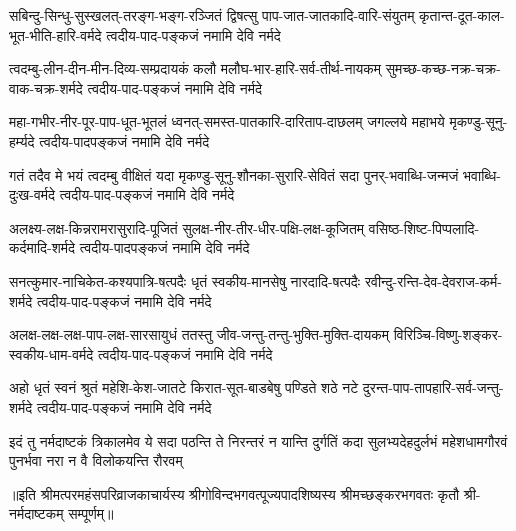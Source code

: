 
\fourlineindentedshloka
{सबिन्दु-सिन्धु-सुस्खलत्-तरङ्ग-भङ्ग-रञ्जितं}
{द्विषत्सु पाप-जात-जातकादि-वारि-संयुतम्}
{कृतान्त-दूत-काल-भूत-भीति-हारि-वर्मदे}
{त्वदीय-पाद-पङ्कजं नमामि देवि नर्मदे} %

\fourlineindentedshloka
{त्वदम्बु-लीन-दीन-मीन-दिव्य-सम्प्रदायकं}
{कलौ मलौघ-भार-हारि-सर्व-तीर्थ-नायकम्}
{सुमच्छ-कच्छ-नक्र-चक्र-वाक-चक्र-शर्मदे}
{त्वदीय-पाद-पङ्कजं नमामि देवि नर्मदे} %

\fourlineindentedshloka
{महा-गभीर-नीर-पूर-पाप-धूत-भूतलं}
{ध्वनत्-समस्त-पातकारि-दारिताप-दाछलम्}
{जगल्लये महाभये मृकण्डु-सूनु-हर्म्यदे}
{त्वदीय-पादपङ्कजं नमामि देवि नर्मदे} %

\fourlineindentedshloka
{गतं तदैव मे भयं त्वदम्बु वीक्षितं यदा}
{मृकण्डु-सूनु-शौनका-सुरारि-सेवितं सदा}
{पुनर्-भवाब्धि-जन्मजं भवाब्धि-दुःख-वर्मदे}
{त्वदीय-पाद-पङ्कजं नमामि देवि नर्मदे} %

\fourlineindentedshloka
{अलक्ष्य-लक्ष-किन्नरामरासुरादि-पूजितं}
{सुलक्ष-नीर-तीर-धीर-पक्षि-लक्ष-कूजितम्}
{वसिष्ठ-शिष्ट-पिप्पलादि-कर्दमादि-शर्मदे}
{त्वदीय-पादपङ्कजं नमामि देवि नर्मदे} %

\fourlineindentedshloka
{सनत्कुमार-नाचिकेत-कश्यपात्रि-षत्पदैः}
{धृतं स्वकीय-मानसेषु नारदादि-षत्पदैः}
{रवीन्दु-रन्ति-देव-देवराज-कर्म-शर्मदे}
{त्वदीय-पाद-पङ्कजं नमामि देवि नर्मदे} %

\fourlineindentedshloka
{अलक्ष-लक्ष-लक्ष-पाप-लक्ष-सारसायुधं}
{ततस्तु जीव-जन्तु-तन्तु-भुक्ति-मुक्ति-दायकम्}
{विरिञ्चि-विष्णु-शङ्कर-स्वकीय-धाम-वर्मदे}
{त्वदीय-पाद-पङ्कजं नमामि देवि नर्मदे} %

\fourlineindentedshloka
{अहो धृतं स्वनं श्रुतं महेशि-केश-जातटे}
{किरात-सूत-बाडबेषु पण्डिते शठे नटे}
{दुरन्त-पाप-तापहारि-सर्व-जन्तु-शर्मदे}
{त्वदीय-पाद-पङ्कजं नमामि देवि नर्मदे} %

\fourlineindentedshloka
{इदं तु नर्मदाष्टकं त्रिकालमेव ये सदा}
{पठन्ति ते निरन्तरं न यान्ति दुर्गतिं कदा}
{सुलभ्यदेहदुर्लभं महेशधामगौरवं}
{पुनर्भवा नरा न वै विलोकयन्ति रौरवम्} %

॥इति श्रीमत्परमहंसपरिव्राजकाचार्यस्य श्रीगोविन्दभगवत्पूज्यपादशिष्यस्य 
श्रीमच्छङ्करभगवतः कृतौ श्री-नर्मदाष्टकम् सम्पूर्णम्॥